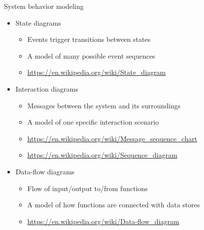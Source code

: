 \begin{Slide}{System behavior modeling}

\begin{itemize}
\item State diagrams
\begin{itemize}
\item Events trigger transitions between states
\item A model of many possible event sequences
\item {\footnotesize\url{https://en.wikipedia.org/wiki/State_diagram}}

\end{itemize}
\item Interaction diagrams
\begin{itemize}
\item Messages between the system and its surroundings
\item A model of one specific interaction scenario
\item {\footnotesize\url{https://en.wikipedia.org/wiki/Message_sequence_chart}}
\item {\footnotesize\url{https://en.wikipedia.org/wiki/Sequence_diagram}}

\end{itemize}
\item Data-flow diagrams
\begin{itemize}
\item Flow of input/output to/from functions
\item A model of how functions are connected with data stores
\item {\footnotesize\url{https://en.wikipedia.org/wiki/Data-flow_diagram}}

\end{itemize}
\end{itemize}
\end{Slide}